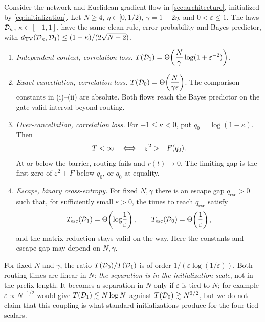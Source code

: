 \begin{mainresult}
\begin{theorem}
\label{thm:separation}
Consider the network and Euclidean gradient flow in \cref{sec:architecture}, initialized by \cref{eq:initialization}.
Let $N\ge4$, $\eta\in[0,1/2)$, $\gamma=1-2\eta$, and $0<\varepsilon\le1$.
The laws $\mathcal D_{\kappa}$, $\kappa\in[-1,1]$, have the same clean rule, error probability and Bayes predictor,
with $d_{\mathrm{TV}}(\mathcal D_{\kappa},\mathcal D_{1})\le(1-\kappa)/(2\sqrt{N-2})$.
\begin{enumerate}[label=(\roman*),leftmargin=*,itemsep=2pt,topsep=2pt]
\item \emph{Independent context, correlation loss.}
$\displaystyle T(\mathcal D_{1})=\Theta\!\left(\frac{N}{\gamma}\log(1+\varepsilon^{-2})\right)$.
\item \emph{Exact cancellation, correlation loss.}
$\displaystyle T(\mathcal D_{0})=\Theta\!\left(\frac{N}{\gamma \varepsilon}\right)$.
The comparison constants in (i)--(ii) are absolute. Both flows reach the Bayes predictor on the gate-valid interval beyond routing.
\item \emph{Over-cancellation, correlation loss.}
For $-1\le \kappa<0$, put $q_0=\log(1-\kappa)$. Then
\[
 T<\infty\quad\Longleftrightarrow\quad \varepsilon^2>-F(q_0).
\]
At or below the barrier, routing fails and $r(t)\to0$.
The limiting gap is the first zero of $\varepsilon^2+F$ below $q_0$, or $q_0$ at equality.
\item \emph{Escape, binary cross-entropy.}
For fixed $N,\gamma$ there is an escape gap $q_{\mathrm{esc}}>0$ such that, for sufficiently small $\varepsilon>0$,
the times to reach $q_{\mathrm{esc}}$ satisfy
\[
 T_{\mathrm{esc}}(\mathcal D_{1})=\Theta\!\left(\log\!\frac{1}{\varepsilon}\right),\qquad
 T_{\mathrm{esc}}(\mathcal D_{0})=\Theta\!\left(\frac{1}{\varepsilon}\right),
\]
and the matrix reduction stays valid on the way.
Here the constants and escape gap may depend on $N,\gamma$.
\end{enumerate}
\end{theorem}
\end{mainresult}

For fixed $N$ and $\gamma$, the ratio $T(\mathcal D_{0})/T(\mathcal D_{1})$ is of order $1/(\varepsilon\log(1/\varepsilon))$. Both routing times are
linear in $N$: \emph{the separation is in the initialization scale}, not in the prefix length. It becomes a separation in $N$ only if $\varepsilon$ is tied to $N$;
for example $\varepsilon\propto N^{-1/2}$ would give $T(\mathcal D_{1})\lesssim N\log N$ against $T(\mathcal D_{0})\gtrsim N^{3/2}$, but we do not claim that this coupling
is what standard initializations produce for the four tied scalars.

